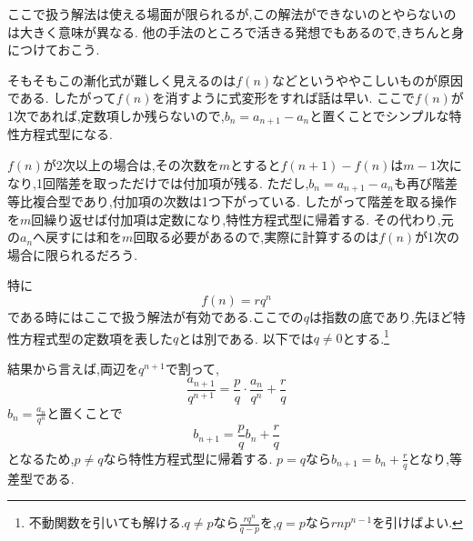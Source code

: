 
ここで扱う解法は使える場面が限られるが,この解法ができないのとやらないのは大きく意味が異なる.
他の手法のところで活きる発想でもあるので,きちんと身につけておこう.

そもそもこの漸化式が難しく見えるのは$f(n)$などというややこしいものが原因である.
したがって$f(n)$を消すように式変形をすれば話は早い.
  \BookMathLayout{\[
    \begin{array}{rrl}
      &a_{n+2}={}&pa_{n+1}+f(n+1)\\
      -\,)&a_{n+1}={}&pa_n+f(n)\\ \hline
      &a_{n+2}-a_{n+1}={}&p(a_{n+1}-a_n)\\
      &&\qquad+f(n+1)-f(n)
    \end{array}
  \]}{\[
    \begin{array}{rrl}
      &a_{n+2}={}&pa_{n+1}+f(n+1)\\
      -\,)&a_{n+1}={}&pa_n+f(n)\\ \hline
      &a_{n+2}-a_{n+1}&\\
      &\multicolumn{2}{l}{{}=p(a_{n+1}-a_n)}\\
      &\multicolumn{2}{l}{\qquad+f(n+1)-f(n)}
    \end{array}
  \]}
  ここで$f(n)$が1次であれば,定数項しか残らないので,$b_n=a_{n+1}-a_n$と置くことでシンプルな特性方程式型になる.
  
  $f(n)$が2次以上の場合は,その次数を$m$とすると$f(n+1)-f(n)$は$m-1$次になり,1回階差を取っただけでは付加項が残る.
  ただし,$b_n=a_{n+1}-a_n$も再び階差等比複合型であり,付加項の次数は1つ下がっている.
  したがって階差を取る操作を$m$回繰り返せば付加項は定数になり,特性方程式型に帰着する.
  その代わり,元の$a_n$へ戻すには和を$m$回取る必要があるので,実際に計算するのは$f(n)$が1次の場合に限られるだろう.
  

  特に
  \[
    f(n)=rq^n
  \]
  である時にはここで扱う解法が有効である.ここでの$q$は指数の底であり,先ほど特性方程式型の定数項を表した$q$とは別である.
  以下では$q\ne0$とする.\footnote{不動関数を引いても解ける.$q\ne p$なら$\frac{rq^n}{q-p}$を,$q=p$なら$rnp^{n-1}$を引けばよい.}
  
   結果から言えば,両辺を$q^{n+1}$で割って,
   \[
      \frac{a_{n+1}}{q^{n+1}}=\frac{p}{q}\cdot\frac{a_n}{q^n}+\frac{r}{q}
   \]
   $b_n=\frac{a_n}{q^n}$と置くことで
   \[
      b_{n+1}=\frac{p}{q}b_n+\frac{r}{q}
   \]
   となるため,$p\ne q$なら特性方程式型に帰着する.
   $p=q$なら$b_{n+1}=b_n+\frac rq$となり,等差型である.
